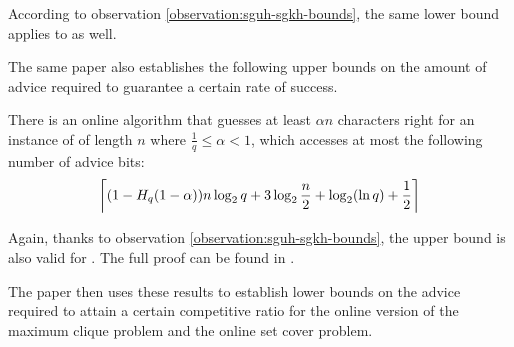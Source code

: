 According to observation \ref{observation:sguh-sgkh-bounds}, the same
lower bound applies to  as well.

The same paper also establishes the following upper bounds on the amount
of advice required to guarantee a certain rate of success.

\begin{theorem}\label{theorem:sguh-upper-ratio}\label{theorem:sgkh-upper-ratio}
    There is an online algorithm that guesses at least $\alpha{}n$
    characters right for an instance of  of length $n$ where
    $\frac{1}{q} \leq \alpha < 1$, which accesses at most the following
    number of advice bits:
    $$
        \ceil*{(1 - H_q(1 - \alpha)) n \lg q + 3 \lg \frac{n}{2} + \lg(\ln
        q) + \frac{1}{2}}
    $$
\end{theorem}

Again, thanks to observation \ref{observation:sguh-sgkh-bounds}, the upper
bound is also valid for . The full proof can be found in
\cite{string-guessing}.

The paper then uses these results to establish lower bounds on the advice
required to attain a certain competitive ratio for the online version of
the maximum clique problem and the online set cover problem.

